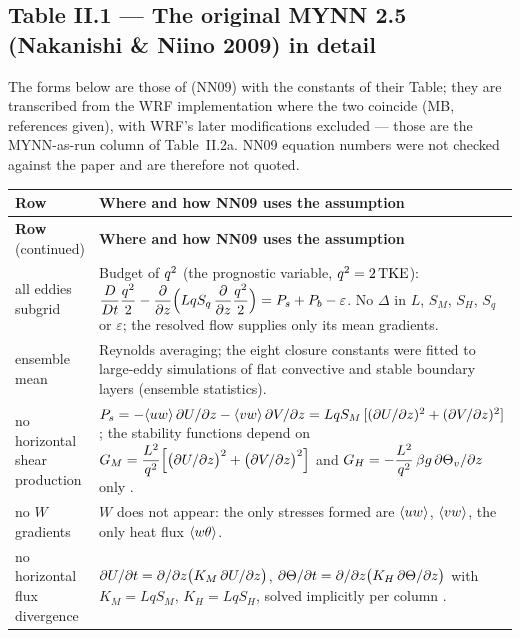 \subsection*{Table II.1 --- The original MYNN 2.5 (Nakanishi \& Niino 2009) in detail}
{\small The forms below are those of \textcite{nakanishi2009} (NN09) with the constants of their
Table; they are transcribed from the WRF implementation where the two coincide (MB, references
given), with WRF's later modifications excluded --- those are the MYNN-as-run column of
Table~II.2a. NN09 equation numbers were not checked against the paper and are therefore not quoted.\par}
\footnotesize
\setlength{\tabcolsep}{4pt}
\renewcommand{\arraystretch}{1.12}
\begin{xltabular}{\linewidth}{@{}>{\raggedright\arraybackslash}p{3.2cm} >{\raggedright\arraybackslash}X@{}}
\toprule
\textbf{Row} & \textbf{Where and how NN09 uses the assumption} \\
\midrule
\endfirsthead
\toprule
\textbf{Row} (continued) & \textbf{Where and how NN09 uses the assumption} \\
\midrule
\endhead
\bottomrule
\endlastfoot
{} all eddies subgrid & Budget of $q^{2}$ (the prognostic variable, $q^{2} = 2\,\mathrm{TKE}$):
$\dfrac{D}{Dt}\dfrac{q^{2}}{2} - \dfrac{\partial}{\partial z}\Big(L q S_q\,\dfrac{\partial}{\partial z}\dfrac{q^{2}}{2}\Big) = P_s + P_b - \varepsilon$.
No $\Delta$ in $L$, $S_M$, $S_H$, $S_q$ or $\varepsilon$; the resolved flow supplies only its mean gradients. \\
 ensemble mean & Reynolds averaging; the eight closure constants were fitted to large-eddy simulations of flat convective and stable boundary layers (ensemble statistics). \\
 no horizontal shear production & $P_s = -\langle uw \rangle\,\partial U/\partial z - \langle vw \rangle\,\partial V/\partial z = L q S_M\,[(\partial U/\partial z)^2 + (\partial V/\partial z)^2]$; the stability functions depend on $G_M = \dfrac{L^2}{q^2}\Big[\big(\partial U/\partial z\big)^2 + \big(\partial V/\partial z\big)^2\Big]$ and $G_H = -\dfrac{L^2}{q^2}\,\beta g\,\partial \Theta_v/\partial z$ only . \\
 no $W$ gradients & $W$ does not appear: the only stresses formed are $\langle uw \rangle$, $\langle vw \rangle$, the only heat flux $\langle w\theta \rangle$. \\
 no horizontal flux divergence & $\partial U/\partial t = \partial /\partial z\big(K_M\,\partial U/\partial z\big)$, $\partial \Theta/\partial t = \partial /\partial z\big(K_H\,\partial \Theta/\partial z\big)$ with $K_M = L q S_M$, $K_H = L q S_H$, solved implicitly per column . \\

\end{xltabular}
